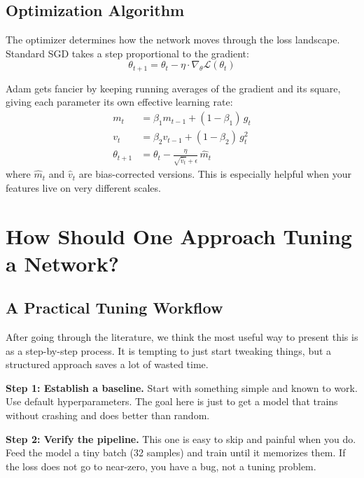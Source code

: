 \documentclass[12pt, letterpaper]{article}
\begin{document}
\subsection{Optimization Algorithm}

The optimizer determines how the network moves through the loss landscape. Standard SGD takes a step proportional to the gradient:
\begin{equation}
    \theta_{t+1} = \theta_t - \eta \cdot \nabla_\theta \mathcal{L}(\theta_t)
\end{equation}

Adam \cite{kingma2015adam} gets fancier by keeping running averages of the gradient and its square, giving each parameter its own effective learning rate:
\begin{align}
    m_t &= \beta_1 m_{t-1} + (1 - \beta_1)\, g_t \\
    v_t &= \beta_2 v_{t-1} + (1 - \beta_2)\, g_t^2 \\
    \theta_{t+1} &= \theta_t - \frac{\eta}{\sqrt{\hat{v}_t} + \epsilon}\, \hat{m}_t
\end{align}
where $\hat{m}_t$ and $\hat{v}_t$ are bias-corrected versions. This is especially helpful when your features live on very different scales.

\section{How Should One Approach Tuning a Network?}

\subsection{A Practical Tuning Workflow}

After going through the literature, we think the most useful way to present this is as a step-by-step process. It is tempting to just start tweaking things, but a structured approach saves a lot of wasted time.

\textbf{Step 1: Establish a baseline.} Start with something simple and known to work. Use default hyperparameters. The goal here is just to get a model that trains without crashing and does better than random.

\textbf{Step 2: Verify the pipeline.} This one is easy to skip and painful when you do. Feed the model a tiny batch (32 samples) and train until it memorizes them. If the loss does not go to near-zero, you have a bug, not a tuning problem.
\end{document}
